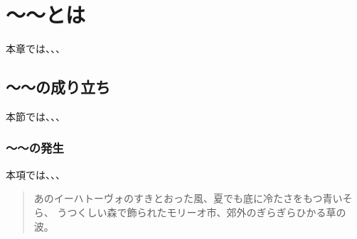 \section{〜〜とは}
本章では、、、

\subsection{〜〜の成り立ち}
本節では、、、

\subsubsection{〜〜の発生}
本項では、、、

\begin{quote}
	あのイーハトーヴォのすきとおった風、夏でも底に冷たさをもつ青いそら、
	うつくしい森で飾られたモリーオ市、郊外のぎらぎらひかる草の波。
\end{quote}

